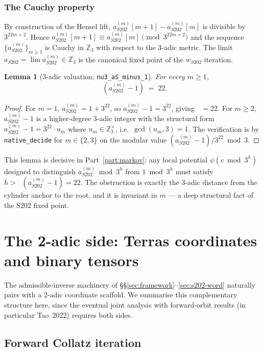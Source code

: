 \documentclass[11pt,a4paper]{article}
\theoremstyle{plain}
\newtheorem{lemma}[theorem]{Lemma}
\theoremstyle{definition}
\newcommand{\Zp}[1]{\mathbb{Z}_{#1}}
\newcommand{\aS}{a_{S202}}
\newcommand{\aSat}{a_{S202}^{(m)}}
\newcommand{\wS}{w_{S202}}
\DeclareMathOperator{\nuthree}{\nu_3}
\begin{document}
\subsubsection*{The Cauchy property}

By construction of the Hensel lift, $\aSat[m+1] - \aSat[m]$ is
divisible by $3^{22m+2}$. Hence
$\aSat[m+1] \equiv \aSat[m] \pmod{3^{22m+2}}$
and the sequence $\{\aSat\}_{m \ge 1}$ is Cauchy in $\Zp{3}$ with
respect to the 3-adic metric. The limit
$\aS = \lim \aSat \in \Zp{3}$ is the canonical fixed point of the
$\wS$ iteration.

\begin{lemma}[3-adic valuation; \texttt{nu3\_aS\_minus\_1}]
\label{lem:nu3-aSm-minus-1}
For every $m \ge 1$,
\[
  \nuthree(\aSat - 1) \;=\; 22.
\]
\end{lemma}

\begin{proof}
For $m = 1$, $\aSat = 1 + 3^{22}$, so $\aSat - 1 = 3^{22}$,
giving $\nuthree = 22$. For $m \ge 2$, $\aSat - 1$ is a higher-degree
$3$-adic integer with the structural form
\(
  \aSat - 1 = 3^{22} \cdot u_m
\)
where $u_m \in \Zp{3}^{\times}$, i.e.\ $\gcd(u_m, 3) = 1$. The
verification is by \texttt{native\_decide} for $m \in \{2, 3\}$ on
the modular value $(\aSat - 1) / 3^{22} \bmod 3$.
\end{proof}

This lemma is decisive in Part~\ref{part:markov}: any local potential
$\psi(c \bmod 3^h)$ designed to distinguish $\aSat \bmod 3^h$ from
$1 \bmod 3^h$ must satisfy $h > \nuthree(\aSat - 1) = 22$. The
obstruction is exactly the 3-adic distance from the cylinder anchor
to the root, and it is invariant in $m$ — a deep structural fact
of the S202 fixed point.

\section{The 2-adic side: Terras coordinates and binary tensors}
\label{sec:terras}

The admissible-inverse machinery of \S\S\ref{sec:framework}--\ref{sec:s202-word}
naturally pairs with a 2-adic coordinate scaffold. We summarise this
complementary structure here, since the eventual joint analysis with
forward-orbit results (in particular Tao~2022) requires both sides.

\subsection{Forward Collatz iteration}
\end{document}
